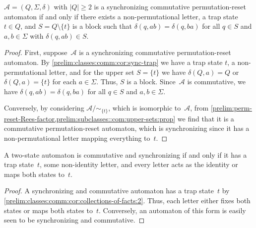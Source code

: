 \begin{proposition}  \label{prelim:classes:comm:cor:collections-of-facts:6}
	$\mathcal A = (Q, \Sigma, \delta)$ with $|Q| \ge 2$ is a synchronizing commutative permutation-reset
	automaton if and only if there exists a non-permutational letter, a trap state $t \in Q$,
	and $S = Q \setminus \{t\}$ is a block
	such that $\delta(q, ab) = \delta(q, ba)$ for all $q \in S$ and $a,b\in \Sigma$
	with $\delta(q,ab) \in S$.
\end{proposition}
\begin{proof}	
	First, suppose~$\mathcal A$
	is a synchronizing commutative permutation-reset automaton.
	By \cref{prelim:classes:comm:cor:sync-trap}
	we have a trap state $t$, a non-permutational letter, and for the upper set $S = \{t\}$
	we have $\delta(Q, a) = Q$ or $\delta(Q, a) = \{t\}$
	for each $a \in \Sigma$. Thus, $S$ is a block.
	Since~$\mathcal A$ is commutative, we have 
	$\delta(q, ab) = \delta(q, ba)$ for all $q \in S$ and $a,b\in \Sigma$.
		
	Conversely, by considering $\mathcal A / {\sim_{\{t\}}}$, which is isomorphic to~$\mathcal A$,
	from \cref{prelim:perm-reset-Rees-factor,prelim:subclasses::com:upper-sets:prop}
	we find that it is a commutative permutation-reset automaton,
	which is synchronizing since it has a non-permutational letter
	mapping everything to~$t$. 
\end{proof}

\begin{proposition} \label{prelim:classes:comm:cor:collections-of-facts:5} 
	A two-state automaton is commutative and synchronizing 
	if and only if it has a trap state~$t$,
	some non-identity letter, and every letter acts as the identity
	or maps both states to~$t$.
\end{proposition}
\begin{proof}
	A synchronizing and commutative automaton
	has a trap state~$t$ by \cref{prelim:classes:comm:cor:collections-of-facts:2}.
	Thus, each letter either fixes both states or maps both states to~$t$.
	Conversely, an automaton of this form is easily seen to be synchronizing and commutative.	
\end{proof}

